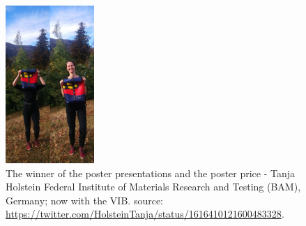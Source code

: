 \begin{figure}[h]
\centering
\includegraphics[width=0.3\textwidth]{images/Tanja}
\caption{The winner of the poster presentations and the poster price - Tanja Holstein Federal Institute of Materials Research and Testing (BAM), Germany; now with the VIB. source: \url{https://twitter.com/HolsteinTanja/status/1616410121600483328}.}
\label{fig:poster}
\end{figure}
